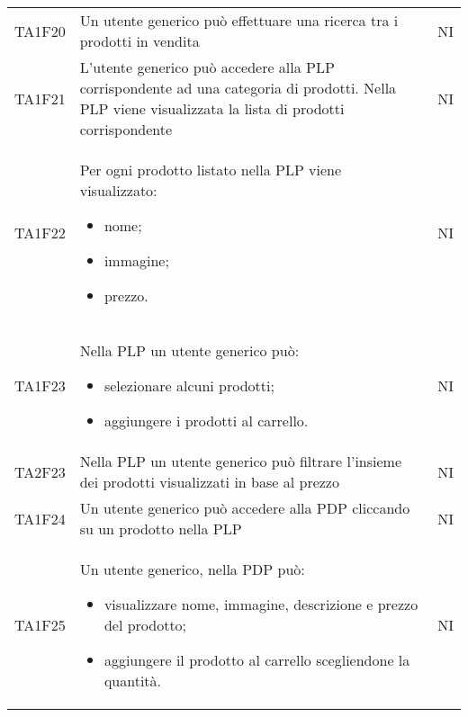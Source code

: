 {\begin{longtable}{C{3cm} C{10.2cm} C{1.5cm}}
TA1F20 & Un utente generico può effettuare una ricerca tra i prodotti in vendita & NI\\

TA1F21 & L'utente generico può accedere alla PLP corrispondente ad una categoria di prodotti. Nella PLP viene visualizzata la lista di prodotti corrispondente & NI\\

TA1F22 & Per ogni prodotto listato nella PLP viene visualizzato:
\begin{itemize}
	\item nome;
	\item immagine;
	\item prezzo.
\end{itemize} & NI\\

TA1F23 & Nella PLP un utente generico può:
\begin{itemize}
	\item selezionare alcuni prodotti;
	\item aggiungere i prodotti al carrello.
\end{itemize} & NI\\

TA2F23 & Nella PLP un utente generico può filtrare l'insieme dei prodotti visualizzati in base al prezzo & NI\\

TA1F24 & Un utente generico può accedere alla PDP cliccando su un prodotto nella PLP & NI\\

TA1F25 & Un utente generico, nella PDP può:
\begin{itemize}
	\item visualizzare nome, immagine, descrizione e prezzo del prodotto;
	\item aggiungere il prodotto al carrello scegliendone la quantità.
\end{itemize} & NI\\



\end{longtable}


}